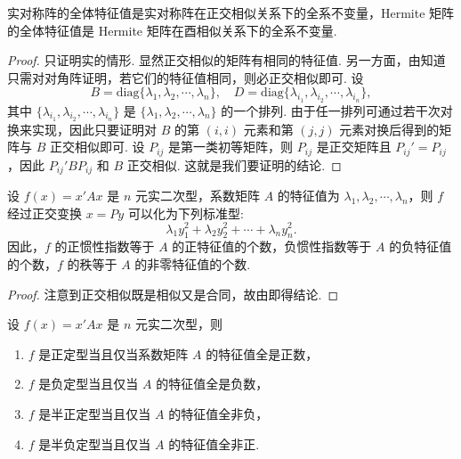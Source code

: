 \documentclass[../../main.tex]{subfiles}
\begin{document}
\begin{corollary}\label{corollary:实对称和Hermite矩阵的全系不变量}
实对称阵的全体特征值是实对称阵在正交相似关系下的全系不变量，Hermite 矩阵的全体特征值是 Hermite 矩阵在酉相似关系下的全系不变量.
\end{corollary}
\begin{proof}
只证明实的情形. 显然正交相似的矩阵有相同的特征值. 另一方面，由知道只需对对角阵证明，若它们的特征值相同，则必正交相似即可. 设
\[
B = \mathrm{diag}\{\lambda_1,\lambda_2,\cdots,\lambda_n\}, \quad D = \mathrm{diag}\{\lambda_{i_1},\lambda_{i_2},\cdots,\lambda_{i_n}\},
\]
其中 $\{\lambda_{i_1},\lambda_{i_2},\cdots,\lambda_{i_n}\}$ 是 $\{\lambda_1,\lambda_2,\cdots,\lambda_n\}$ 的一个排列. 由于任一排列可通过若干次对换来实现，因此只要证明对 $B$ 的第 $(i,i)$ 元素和第 $(j,j)$ 元素对换后得到的矩阵与 $B$ 正交相似即可. 设 $P_{ij}$ 是第一类初等矩阵，则 $P_{ij}$ 是正交矩阵且 $P_{ij}' = P_{ij}$，因此 $P_{ij}'BP_{ij}$ 和 $B$ 正交相似. 这就是我们要证明的结论.
\end{proof}

\begin{theorem}\label{theorem:二次型经正交变换后可化为标准型}
设 $f(x) = x'Ax$ 是 $n$ 元实二次型，系数矩阵 $A$ 的特征值为 $\lambda_1,\lambda_2,\cdots,\lambda_n$，则 $f$ 经过正交变换 $x = Py$ 可以化为下列标准型:
\[
\lambda_1y_1^2 + \lambda_2y_2^2 + \cdots + \lambda_ny_n^2.
\]
因此，$f$ 的正惯性指数等于 $A$ 的正特征值的个数，负惯性指数等于 $A$ 的负特征值的个数，$f$ 的秩等于 $A$ 的非零特征值的个数.
\end{theorem}
\begin{proof}
注意到正交相似既是相似又是合同，故由即得结论. 
\end{proof}

\begin{corollary}\label{corollary:二次型式(半)正定型(负定型)的充要条件}
设 $f(x) = x'Ax$ 是 $n$ 元实二次型，则 
\begin{enumerate}
\item $f$ 是正定型当且仅当系数矩阵 $A$ 的特征值全是正数，

\item $f$ 是负定型当且仅当 $A$ 的特征值全是负数，

\item $f$ 是半正定型当且仅当 $A$ 的特征值全非负，

\item $f$ 是半负定型当且仅当 $A$ 的特征值全非正.
\end{enumerate}
\end{corollary}
\end{document}
